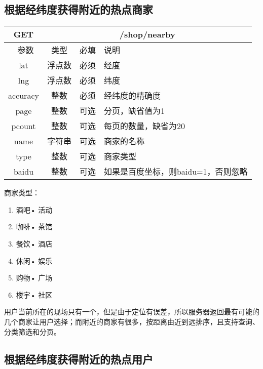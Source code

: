 \documentclass[cs4size]{ctexartutf8}
\begin{document}
\subsection{根据经纬度获得附近的热点商家}

\begin{table}[H]
   \begin{center}
\begin{tabular}{|c|c|c|p{12cm}|}
\hline
GET & \multicolumn{3}{|c|}{/shop/nearby} \\
\hline\hline
 \  参数  & 类型 & 必填 &  说明  \\
\hline
 lat  & 浮点数 & 必须 & 经度\\
\hline
 lng  &  浮点数 & 必须 & 纬度\\ 
\hline
 accuracy  & 整数 & 必须 & 经纬度的精确度\\ 
 \hline
 page  & 整数 & 可选 & 分页，缺省值为1\\ 
 \hline
 pcount  & 整数 & 可选 & 每页的数量，缺省为20\\ 
  \hline
 name  & 字符串 & 可选 & 商家的名称\\ 
  \hline
 type  & 整数 & 可选 & 商家类型\\  
\hline
 baidu  & 整数 & 可选 & 如果是百度坐标，则baidu=1，否则忽略\\  
\hline
\end{tabular}
   \end{center}
\end{table}

商家类型：
\begin{enumerate}
\item 酒吧• 活动
\item 咖啡• 茶馆   
\item 餐饮• 酒店
\item 休闲• 娱乐
\item 购物• 广场
\item 楼宇• 社区
\end{enumerate}


用户当前所在的现场只有一个，但是由于定位有误差，所以服务器返回最有可能的几个商家让用户选择；而附近的商家有很多，按距离由近到远排序，且支持查询、分类筛选和分页。


\subsection{根据经纬度获得附近的热点用户}
\end{document}
